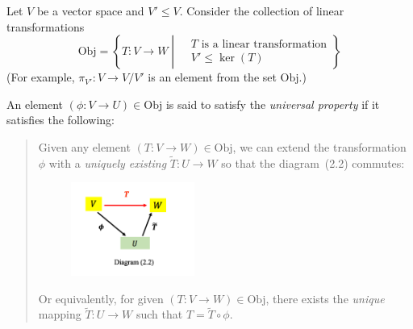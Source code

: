 \begin{definition}
Let $V$ be a vector space and $V'\le V$. Consider the collection of linear transformations
\[
\text{Obj}=\left\{T:V\to W\middle| 
\begin{aligned}
&\text{$T$ is a linear transformation}\\
&V'\le\ker(T)
\end{aligned}
\right\}
\]
(For example, $\pi_{V'}:V\to V/ V'$ is an element from the set $\text{Obj}$.)

An element $(\phi: V\to U)\in\text{Obj}$ is said to satisfy the \emph{universal property} if it satisfies the following:
\begin{quotation}
Given any element $(T:V\to W)\in\text{Obj}$, 
we can extend the transformation $\phi$ with a \emph{uniquely existing} $\tilde{T}:U\to W$ so that the diagram~(2.2) commutes:
\begin{figure}[H]
\centering
\includegraphics[width=0.4\textwidth]{week4/p_3}
\end{figure}
Or equivalently, for given $(T:V\to W)\in\text{Obj}$, there exists the \emph{unique} mapping $\tilde{T}:U\to W$ such that $T=\tilde{T}\circ\phi$.
\end{quotation}
\end{definition}

